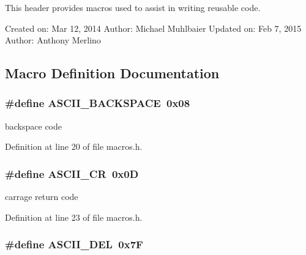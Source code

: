 This header provides macros used to assist in writing reusable code.

Created on\+: Mar 12, 2014 Author\+: Michael Muhlbaier Updated on\+: Feb 7, 2015 Author\+: Anthony Merlino 

\subsection{Macro Definition Documentation}
\hypertarget{group__macros_ga97f70a2430c640e184380e20e1c1d0ea}{}
\subsubsection[{A\+S\+C\+I\+I\+\_\+\+B\+A\+C\+K\+S\+P\+A\+C\+E}]{\setlength{\rightskip}{0pt plus 5cm}\#define A\+S\+C\+I\+I\+\_\+\+B\+A\+C\+K\+S\+P\+A\+C\+E~0x08}\label{group__macros_ga97f70a2430c640e184380e20e1c1d0ea}


backspace code 



Definition at line 20 of file macros.\+h.

\hypertarget{group__macros_ga089ed4925403ab02a05e603967c74579}{}
\subsubsection[{A\+S\+C\+I\+I\+\_\+\+C\+R}]{\setlength{\rightskip}{0pt plus 5cm}\#define A\+S\+C\+I\+I\+\_\+\+C\+R~0x0\+D}\label{group__macros_ga089ed4925403ab02a05e603967c74579}


carrage return code 



Definition at line 23 of file macros.\+h.

\hypertarget{group__macros_ga3bb28e223b7c203113dc8c0387d43b36}{}
\subsubsection[{A\+S\+C\+I\+I\+\_\+\+D\+E\+L}]{\setlength{\rightskip}{0pt plus 5cm}\#define A\+S\+C\+I\+I\+\_\+\+D\+E\+L~0x7\+F}\label{group__macros_ga3bb28e223b7c203113dc8c0387d43b36}


